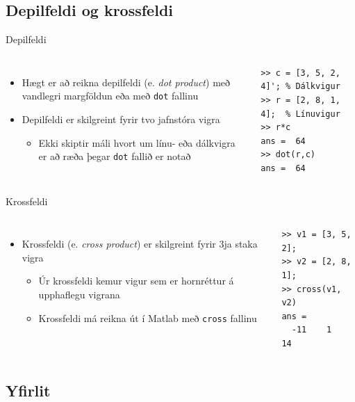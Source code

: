 \documentclass[handout]{beamer}
\begin{document}
\subsection{Depilfeldi og krossfeldi}

\begin{frame}[fragile]{Depilfeldi}
\begin{columns}
\begin{itemize}
 \item Hægt er að reikna depilfeldi (e. \emph{dot product}) með vandlegri margföldun eða með \texttt{dot} fallinu
 \item Depilfeldi er skilgreint fyrir tvo jafnstóra vigra
 \begin{itemize}
  \item Ekki skiptir máli hvort um línu- eða dálkvigra er að ræða þegar \texttt{dot} fallið er notað
 \end{itemize}
\end{itemize}
\begin{verbatim}
>> c = [3, 5, 2, 4]'; % Dálkvigur
>> r = [2, 8, 1, 4];  % Línuvigur
>> r*c
ans =  64
>> dot(r,c)
ans =  64
\end{verbatim}
\end{columns}
\end{frame}

\begin{frame}[fragile]{Krossfeldi}
\begin{columns}
\begin{itemize}
 \item Krossfeldi (e. \emph{cross product}) er skilgreint fyrir 3ja staka vigra
 \begin{itemize}
  \item Úr krossfeldi kemur vigur sem er hornréttur á upphaflegu vigrana
  \item Krossfeldi má reikna út í Matlab með \texttt{cross} fallinu
 \end{itemize}
\end{itemize}
\begin{verbatim}
>> v1 = [3, 5, 2];
>> v2 = [2, 8, 1];
>> cross(v1, v2)
ans =
  -11    1   14
\end{verbatim}
\end{columns}
\end{frame}

\subsection{Yfirlit}
\end{document}
